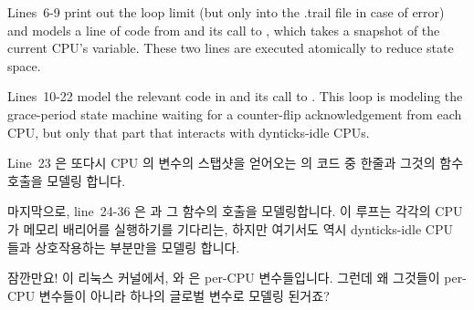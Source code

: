 Lines~6-9 print out the loop limit (but only into the .trail file
in case of error) and models a line of code
from  and its call to
, which takes a
snapshot of the current CPU's 
variable.
These two lines are executed atomically to reduce state space.

Lines~10-22 model the relevant code in
 and its call to
.
This loop is modeling the grace-period state machine waiting for
a counter-flip acknowledgement from each CPU, but only that part
that interacts with dynticks-idle CPUs.
\fi

Line~23 은 또다시 CPU 의  변수의 스탭샷을
얻어오는  의 코드 중 한줄과 그것의
 함수 호출을 모델링 합니다.

마지막으로, line~24-36 은  과 그 함수의
 호출을 모델링합니다.
이 루프는 각각의 CPU 가 메모리 배리어를 실행하기를 기다리는, 하지만 여기서도
역시 dynticks-idle CPU 들과 상호작용하는 부분만을 모델링 합니다.
\iffalse

Line~23 models a line from \co{rcu_try_flip_waitzero()}
and its call to \co{dyntick_save_progress_counter()}, again
taking a snapshot of the CPU's \co{dynticks_progress_counter}
variable.

Finally, lines~24-36 model the relevant code in
\co{rcu_try_flip_waitack()} and its call to
\co{rcu_try_flip_waitack_needed()}.
This loop is modeling the grace-period state-machine waiting for
each CPU to execute a memory barrier, but again only that part
that interacts with dynticks-idle CPUs.
\fi

\QuickQuiz{}
	잠깐만요!
	이 리눅스 커널에서,  와
	 은 per-CPU 변수들입니다.
	그런데 왜 그것들이 per-CPU 변수들이 아니라 하나의 글로벌 변수로 모델링
	된거죠?
	\iffalse

